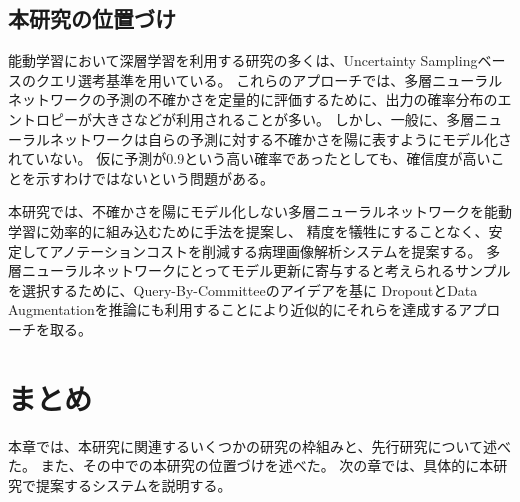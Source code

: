 \subsection{本研究の位置づけ}
能動学習において深層学習を利用する研究の多くは、Uncertainty Samplingベースのクエリ選考基準を用いている。
これらのアプローチでは、多層ニューラルネットワークの予測の不確かさを定量的に評価するために、出力の確率分布のエントロピーが大きさなどが利用されることが多い。
しかし、一般に、多層ニューラルネットワークは自らの予測に対する不確かさを陽に表すようにモデル化されていない。
仮に予測が0.9という高い確率であったとしても、確信度が高いことを示すわけではないという問題がある。

本研究では、不確かさを陽にモデル化しない多層ニューラルネットワークを能動学習に効率的に組み込むために手法を提案し、
精度を犠牲にすることなく、安定してアノテーションコストを削減する病理画像解析システムを提案する。
多層ニューラルネットワークにとってモデル更新に寄与すると考えられるサンプルを選択するために、Query-By-Committeeのアイデアを基に
DropoutとData Augmentationを推論にも利用することにより近似的にそれらを達成するアプローチを取る。

\section{まとめ}
本章では、本研究に関連するいくつかの研究の枠組みと、先行研究について述べた。
また、その中での本研究の位置づけを述べた。
次の章では、具体的に本研究で提案するシステムを説明する。